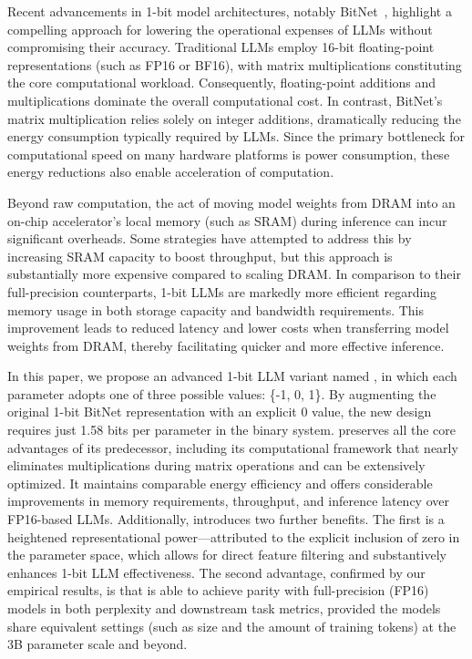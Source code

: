 Recent advancements in 1-bit model architectures, notably BitNet~\cite{bitnet}, highlight a compelling approach for lowering the operational expenses of LLMs without compromising their accuracy. Traditional LLMs employ 16-bit floating-point representations (such as FP16 or BF16), with matrix multiplications constituting the core computational workload. Consequently, floating-point additions and multiplications dominate the overall computational cost. In contrast, BitNet’s matrix multiplication relies solely on integer additions, dramatically reducing the energy consumption typically required by LLMs. Since the primary bottleneck for computational speed on many hardware platforms is power consumption, these energy reductions also enable acceleration of computation.

Beyond raw computation, the act of moving model weights from DRAM into an on-chip accelerator’s local memory (such as SRAM) during inference can incur significant overheads. Some strategies have attempted to address this by increasing SRAM capacity to boost throughput, but this approach is substantially more expensive compared to scaling DRAM. In comparison to their full-precision counterparts, 1-bit LLMs are markedly more efficient regarding memory usage in both storage capacity and bandwidth requirements. This improvement leads to reduced latency and lower costs when transferring model weights from DRAM, thereby facilitating quicker and more effective inference.

In this paper, we propose an advanced 1-bit LLM variant named \textbf{}, in which each parameter adopts one of three possible values: \{-1, 0, 1\}. By augmenting the original 1-bit BitNet representation with an explicit 0 value, the new design requires just 1.58 bits per parameter in the binary system.  preserves all the core advantages of its predecessor, including its computational framework that nearly eliminates multiplications during matrix operations and can be extensively optimized. It maintains comparable energy efficiency and offers considerable improvements in memory requirements, throughput, and inference latency over FP16-based LLMs. Additionally,  introduces two further benefits. The first is a heightened representational power—attributed to the explicit inclusion of zero in the parameter space, which allows for direct feature filtering and substantively enhances 1-bit LLM effectiveness. The second advantage, confirmed by our empirical results, is that  is able to achieve parity with full-precision (FP16) models in both perplexity and downstream task metrics, provided the models share equivalent settings (such as size and the amount of training tokens) at the 3B parameter scale and beyond.


